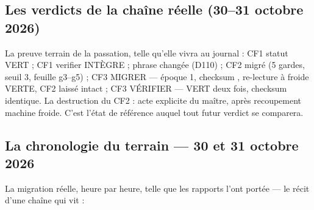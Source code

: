 \subsection{Les verdicts de la chaîne réelle (30--31 octobre 2026)}

La preuve terrain de la passation, telle qu'elle vivra au journal : CF1 statut VERT ;
CF1 verifier INTÈGRE ; phrase changée (D110) ; CF2 migré (5 gardes, seuil 3, feuille
g3--g5) ; CF3 MIGRER — époque 1, checksum , re-lecture à froide VERTE,
CF2 laissé intact ; CF3 VÉRIFIER — VERT deux fois, checksum identique. La destruction
du CF2 : acte explicite du maître, après recoupement machine froide. C'est l'état de
référence auquel tout futur verdict se comparera.

\subsection{La chronologie du terrain — 30 et 31 octobre 2026}\label{sec:chronoterrain}

La migration réelle, heure par heure, telle que les rapports l'ont portée — le récit
d'une chaîne qui vit :

